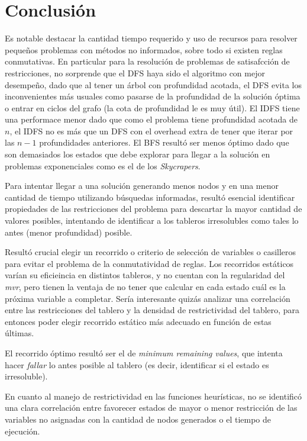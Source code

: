 \documentclass[%
    final,
    reprint,
    notitlepage,
    narroweqnarray,
    inline,
    twoside,
    invited
    ]{ieee}
\begin{document}
\section{Conclusión}

\PARstart Es notable destacar la cantidad tiempo requerido y uso de recursos para resolver pequeños problemas con métodos no informados, sobre todo si existen reglas conmutativas. 
 En particular para la resolución de problemas de satisafcción de restricciones, no sorprende que el DFS haya sido el algoritmo con mejor desempeño, dado que al tener un árbol con profundidad acotada, el DFS evita los inconvenientes más usuales como pasarse de la profundidad de la solución óptima o entrar en ciclos del grafo (la cota de profundidad le es muy útil). El IDFS tiene una performace menor dado que como el problema tiene profundidad acotada de $n$, el IDFS no es más que un DFS con el overhead extra de tener que iterar por las $n-1$ profundidades anteriores. El BFS resultó ser menos óptimo dado que son demasiados los estados que debe explorar para llegar a la solución en problemas exponenciales como es el de los \textit{Skycrapers}. 
\par Para intentar llegar a una solución generando menos nodos y en una menor cantidad de tiempo utilizando búsquedas informadas, resultó esencial identificar 
propiedades de las restricciones del problema para descartar la mayor cantidad de valores posibles, intentando de identificar a los tableros irresolubles como tales 
lo antes (menor profundidad) posible.
\par Resultó crucial elegir un recorrido o criterio de selección de variables o casilleros para evitar el problema de la conmutatividad de reglas. Los 
recorridos estáticos varían su eficieincia en distintos tableros, y no cuentan con la regularidad del \textit{mvr}, pero tienen la ventaja de no 
tener que calcular en cada estado cuál es la próxima variable a completar. Sería interesante quizás analizar una correlación entre las restricciones 
del tablero y la densidad de restrictividad del tablero, para entonces poder elegir recorrido estático más adecuado en función de estas últimas.
\par El recorrido óptimo resultó ser el de \textit{minimum remaining values}, que intenta hacer \textit{fallar} lo antes posible al tablero (es decir, 
identificar si el estado es irresoluble).
\par En cuanto al manejo de restrictividad en las funciones heurísticas, no se identificó una clara correlación entre 
favorecer estados de mayor o menor restricción de las variables no asignadas con la cantidad de nodos generados o el tiempo de ejecución. 
\end{document}
